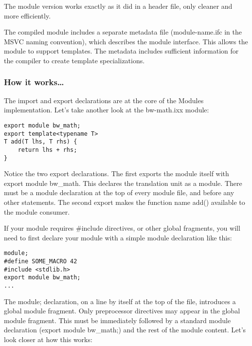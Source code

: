The module version works exactly as it did in a header file, only cleaner and more efficiently.

\begin{tcolorbox}[colback=webgreen!5!white,colframe=webgreen!75!black,title=Note]
The compiled module includes a separate metadata file (module-name.ifc in the MSVC naming convention), which describes the module interface. This allows the module to support templates. The metadata includes sufficient information for the compiler to create template specializations.
\end{tcolorbox}

\subsubsection{How it works…}

The import and export declarations are at the core of the Modules implementation. Let's take another look at the bw-math.ixx module:

\begin{lstlisting}[style=styleCXX]
export module bw_math;
export template<typename T>
T add(T lhs, T rhs) {
	return lhs + rhs;
}
\end{lstlisting}

Notice the two export declarations. The first exports the module itself with export module bw\_math. This declares the translation unit as a module. There must be a module declaration at the top of every module file, and before any other statements. The second export makes the function name add() available to the module consumer.

If your module requires \#include directives, or other global fragments, you will need to first declare your module with a simple module declaration like this:

\begin{lstlisting}[style=styleCXX]
module;
#define SOME_MACRO 42
#include <stdlib.h>
export module bw_math;
...
\end{lstlisting}

The module; declaration, on a line by itself at the top of the file, introduces a global module fragment. Only preprocessor directives may appear in the global module fragment. This must be immediately followed by a standard module declaration (export module bw\_math;) and the rest of the module content. Let's look closer at how this works:

